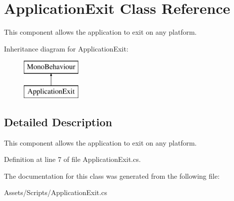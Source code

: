 \hypertarget{class_application_exit}{\section{Application\+Exit Class Reference}
\label{class_application_exit}
}


This component allows the application to exit on any platform.  


Inheritance diagram for Application\+Exit\+:\begin{figure}[H]
\begin{center}
\leavevmode
\includegraphics[height=2.000000cm]{class_application_exit}
\end{center}
\end{figure}


\subsection{Detailed Description}
This component allows the application to exit on any platform. 



Definition at line 7 of file Application\+Exit.\+cs.



The documentation for this class was generated from the following file\+:\begin{DoxyCompactItemize}
\item 
Assets/\+Scripts/Application\+Exit.\+cs\end{DoxyCompactItemize}
